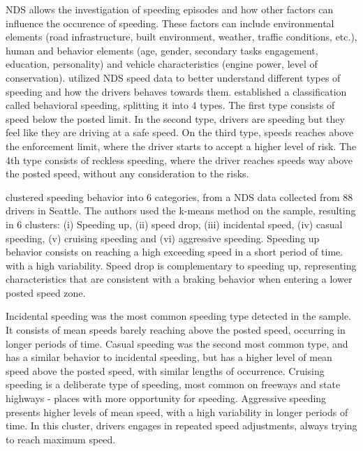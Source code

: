 


NDS allows the investigation of speeding episodes and how other factors can influence the occurence of speeding. These factors can include environmental elements (road infrastructure, built environment, weather, traffic conditions, etc.), human and behavior elements (age, gender, secondary tasks engagement, education, personality) and vehicle characteristics (engine power, level of conservation). \textcite{Richard2013,Richard2017, Richard2020} utilized NDS speed data to better understand different types of speeding and how the drivers behaves towards them. \textcite{Richard2013} established a classification called behavioral speeding, splitting it into 4 types. The first type consists of speed below the posted limit. In the second type, drivers are speeding but they feel like they are driving at a safe speed. On the third type, speeds reaches above the enforcement limit, where the driver starts to accept a higher level of risk. The 4th type consists of reckless speeding, where the driver reaches speeds way above the posted speed, without any consideration to the risks. 

\textcite{Richard2017} clustered speeding behavior into 6 categories, from a NDS data collected from 88 drivers in Seattle. The authors used the k-means method on the sample, resulting in 6 clusters: (i) Speeding up, (ii) speed drop, (iii) incidental speed, (iv) casual speeding, (v) cruising speeding and (vi) aggressive speeding. Speeding up behavior consists on reaching a high exceeding speed in a short period of time. with a high variability. Speed drop is complementary to speeding up, representing characteristics that are consistent with a braking behavior when entering a lower posted speed zone. 

Incidental speeding was the most common speeding type detected in the sample. It consists of mean speeds barely reaching above the posted speed, occurring in longer periods of time. Casual speeding was the second most common type, and has a similar behavior to incidental speeding, but has a higher level of mean speed above the posted speed, with similar lengths of occurrence. Cruising speeding is a deliberate type of speeding, most common on freeways and state highways - places with more opportunity for speeding. Aggressive speeding presents higher levels of mean speed, with a high variability in longer periods of time. In this cluster, drivers engages in repeated speed adjustments, always trying to reach maximum speed.

